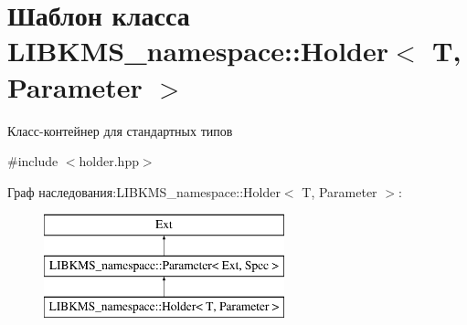 \hypertarget{classLIBKMS__namespace_1_1Holder}{\section{Шаблон класса L\-I\-B\-K\-M\-S\-\_\-namespace\-:\-:Holder$<$ T, Parameter $>$}
\label{classLIBKMS__namespace_1_1Holder}
}


Класс-\/контейнер для стандартных типов  




{\ttfamily \#include $<$holder.\-hpp$>$}

Граф наследования\-:L\-I\-B\-K\-M\-S\-\_\-namespace\-:\-:Holder$<$ T, Parameter $>$\-:\begin{figure}[H]
\begin{center}
\leavevmode
\includegraphics[height=3.000000cm]{classLIBKMS__namespace_1_1Holder}
\end{center}
\end{figure}
